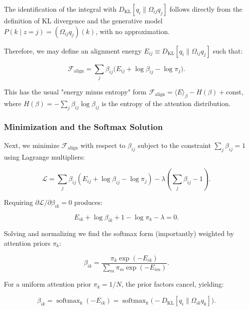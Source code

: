\documentclass[twoside,11pt]{article}
\begin{document}
The identification of the integral with $D_{\mathrm{KL}}[q_i \| \Omega_{ij} q_j]$ follows directly from the definition of KL divergence and the generative model $P(k \mid z{=}j) = (\Omega_{ij} q_j)(k)$, with no approximation.

Therefore, we may define an alignment energy $E_{ij} \equiv D_{\mathrm{KL}}[q_i \| \Omega_{ij} q_j]$ such that:

\begin{equation}
\mathcal{F}_{\text{align}} = \sum_j \beta_{ij} \big( E_{ij} + \log \beta_{ij} - \log \pi_j \big).
\label{eq:mixture_energy_entropy}
\end{equation}

This has the usual "energy minus entropy" form $\mathcal{F}_{\text{align}} = \langle E \rangle_\beta - H(\beta) + \text{const}$, where $H(\beta) = -\sum_j \beta_{ij} \log \beta_{ij}$ is the entropy of the attention distribution.

\subsubsection{Minimization and the Softmax Solution}

Next, we minimize $\mathcal{F}_{\text{align}}$ with respect to $\beta_{ij}$ subject to the constraint $\sum_j \beta_{ij} = 1$ using Lagrange multipliers:

\begin{equation}
\mathcal{L} = \sum_j \beta_{ij}(E_{ij} + \log \beta_{ij} - \log \pi_j) - \lambda\left(\sum_j \beta_{ij} - 1\right).
\end{equation}

Requiring $\partial \mathcal{L} / \partial \beta_{ik} = 0$ produces:

\begin{equation}
E_{ik} + \log \beta_{ik} + 1 - \log \pi_k - \lambda = 0.
\end{equation}

Solving and normalizing we find the softmax form (importantly) weighted by attention priors $\pi_k$:

\begin{equation}
\beta_{ik} = \frac{\pi_k \exp(-E_{ik})}{\sum_m \pi_m \exp(-E_{im})}.
\label{eq:mixture_softmax_general}
\end{equation}

For a uniform attention prior $\pi_k = 1/N$, the prior factors cancel, yielding:

\begin{equation}
\boxed{\beta_{ik} = \operatorname{softmax}_k(-E_{ik}) = \operatorname{softmax}_k\!\big(-D_{\mathrm{KL}}[q_i \| \Omega_{ik} q_k]\big).}
\label{eq:mixture_softmax}
\end{equation}
\end{document}

